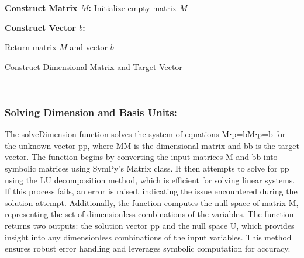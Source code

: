 \documentclass{article}
\begin{document}
\begin{algorithm}[H]
\SetAlgoLined
{}

\textbf{Construct Matrix \(M\):}\;
Initialize empty matrix \(M\)\;

\textbf{Construct Vector \(b\):}\;

Return matrix \(M\) and vector \(b\)\;

\caption{Construct Dimensional Matrix and Target Vector}
\label{alg:get_matrix_target} %
\end{algorithm}\\






\subsubsection{Solving Dimension and Basis Units:}



The solveDimension function solves the system of equations M⋅p=bM⋅p=b for the unknown vector pp, where MM is the dimensional matrix and bb is the target vector. The function begins by converting the input matrices M and bb into symbolic matrices using SymPy's Matrix class. It then attempts to solve for pp using the LU decomposition method, which is efficient for solving linear systems. If this process fails, an error is raised, indicating the issue encountered during the solution attempt. Additionally, the function computes the null space of matrix M, representing the set of dimensionless combinations of the variables. The function returns two outputs: the solution vector pp and the null space U, which provides insight into any dimensionless combinations of the input variables. This method ensures robust error handling and leverages symbolic computation for accuracy.\\
\end{document}
